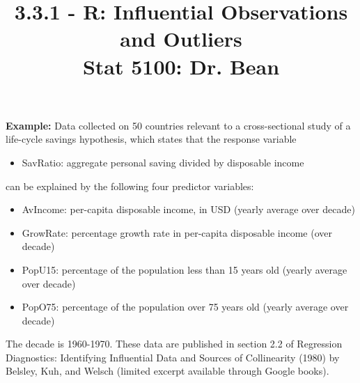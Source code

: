 \documentclass{article}\usepackage[]{graphicx}\usepackage[]{color}
\begin{document}
\title{%
  3.3.1 - R: Influential Observations and Outliers \\
  \smallskip
  \large Stat 5100: Dr. Bean
}
\date{}

\maketitle

\textbf{Example:} Data collected on 50 countries relevant to a cross-sectional study of a life-cycle savings hypothesis, which states that the response variable

\begin{itemize}
  \item SavRatio: aggregate personal saving divided by disposable income
\end{itemize}

can be explained by the following four predictor variables:

\begin{itemize}
  \item AvIncome: per-capita disposable income, in USD (yearly average over decade)
  \item GrowRate: percentage growth rate in per-capita disposable income (over decade)
  \item PopU15: percentage of the population less than 15 years old (yearly average over decade)
  \item PopO75: percentage of the population over 75 years old (yearly average over decade)
\end{itemize}

The decade is 1960-1970.  These data are published in section 2.2 of Regression Diagnostics: Identifying Influential Data and Sources of Collinearity (1980) by Belsley, Kuh, and Welsch (limited excerpt available through Google books).
\end{document}
